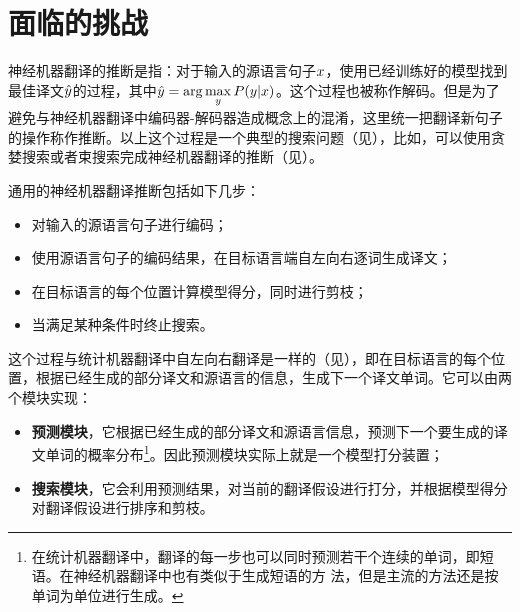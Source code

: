 \section{面临的挑战}

\parinterval 神经机器翻译的推断是指：对于输入的源语言句子${x}$，使用已经训练好的模型找到最佳译文$\hat{{y}}$的过程，其中$\hat{{y}}=\arg\max\limits_{{y}}{P}({y}|{x})$。这个过程也被称作解码。但是为了避免与神经机器翻译中编码器-解码器造成概念上的混淆，这里统一把翻译新句子的操作称作推断。以上这个过程是一个典型的搜索问题（见{\chaptertwo}），比如，可以使用贪婪搜索或者束搜索完成神经机器翻译的推断（见{\chapterten}）。

\parinterval 通用的神经机器翻译推断包括如下几步：

\begin{itemize}
\vspace{0.5em}
\item 对输入的源语言句子进行编码；
\vspace{0.5em}
\item 使用源语言句子的编码结果，在目标语言端自左向右逐词生成译文；
\vspace{0.5em}
\item 在目标语言的每个位置计算模型得分，同时进行剪枝；
\vspace{0.5em}
\item 当满足某种条件时终止搜索。
\vspace{0.5em}
\end{itemize}

\parinterval 这个过程与统计机器翻译中自左向右翻译是一样的（见{\chapterseven}），即在目标语言的每个位置，根据已经生成的部分译文和源语言的信息，生成下一个译文单词。它可以由两个模块实现：

\begin{itemize}
\vspace{0.5em}
\item {\small\sffamily\bfseries{预测模块}}，它根据已经生成的部分译文和源语言信息，预测下一个要生成的译文单词的概率分布\footnote{在统计机器翻译中，翻译的每一步也可以同时预测若干个连续的单词，即短语。在神经机器翻译中也有类似于生成短语的方
法，但是主流的方法还是按单词为单位进行生成。}。因此预测模块实际上就是一个模型打分装置；
\vspace{0.5em}
\item {\small\sffamily\bfseries{搜索模块}}，它会利用预测结果，对当前的翻译假设进行打分，并根据模型得分对翻译假设进行排序和剪枝。
\vspace{0.5em}
\end{itemize}

